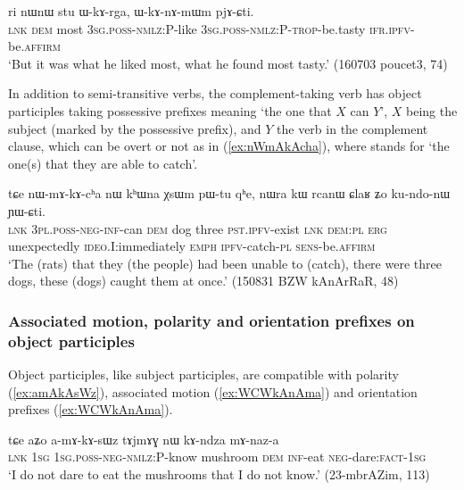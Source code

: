 \begin{exe}
\ex \label{ex:stu.WkArga}
\gll ri nɯnɯ stu ɯ-kɤ-rga, ɯ-kɤ-nɤ-mɯm pjɤ-ɕti. \\
\textsc{lnk} \textsc{dem}  most \textsc{3sg}.\textsc{poss}-\textsc{nmlz}:P-like \textsc{3sg}.\textsc{poss}-\textsc{nmlz}:P-\textsc{trop}-be.tasty \textsc{ifr}.\textsc{ipfv}-be.\textsc{affirm} \\
\glt `But it was what he liked most, what he found most tasty.' (160703 poucet3, 74)
\end{exe}

In addition to semi-transitive verbs, the complement-taking verb  has object participles taking possessive prefixes meaning `the one that $X$ can $Y$', $X$ being the subject (marked by the possessive prefix), and $Y$ the verb in the complement clause, which can be overt or not as in (\ref{ex:nWmAkAcha}), where  stands for  `the one(s) that they are able to catch'.
 
\begin{exe}
\ex  \label{ex:nWmAkAcha}
\gll tɕe nɯ-mɤ-kɤ-cʰa nɯ kʰɯna χsɯm pɯ-tu qʰe, nɯra kɯ rcanɯ ɕlaʁ ʑo ku-ndo-nɯ ɲɯ-ɕti. \\
\textsc{lnk} \textsc{3pl}.\textsc{poss}-\textsc{neg}-\textsc{inf}-can \textsc{dem} dog three \textsc{pst}.\textsc{ipfv}-exist \textsc{lnk} \textsc{dem}:\textsc{pl} \textsc{erg} unexpectedly \textsc{ideo}.I:immediately \textsc{emph} \textsc{ipfv}-catch-\textsc{pl} \textsc{sens}-be.\textsc{affirm} \\
\glt `The (rats) that they (the people) had been unable to (catch), there were three dogs, these (dogs) caught them at once.' (150831 BZW kAnArRaR, 48)
\end{exe}

\subsubsection{Associated motion, polarity and orientation prefixes on object participles}  \label{sec:object.participle.other.prefixes}
Object participles, like subject participles, are compatible with polarity (\ref{ex:amAkAsWz}), associated motion (\ref{ex:WCWkAnAma}) and orientation prefixes (\ref{ex:WCWkAnAma}).

\begin{exe}
\ex  \label{ex:amAkAsWz}
\gll tɕe aʑo a-mɤ-kɤ-sɯz tɤjmɤɣ nɯ kɤ-ndza mɤ-naz-a \\
\textsc{lnk} \textsc{1sg} \textsc{1sg}.\textsc{poss}-\textsc{neg}-\textsc{nmlz}:P-know mushroom \textsc{dem} \textsc{inf}-eat \textsc{neg}-dare:\textsc{fact}-\textsc{1sg}  \\
\glt `I do not dare to eat the mushrooms that I do not know.' (23-mbrAZim, 113)
\end{exe}

